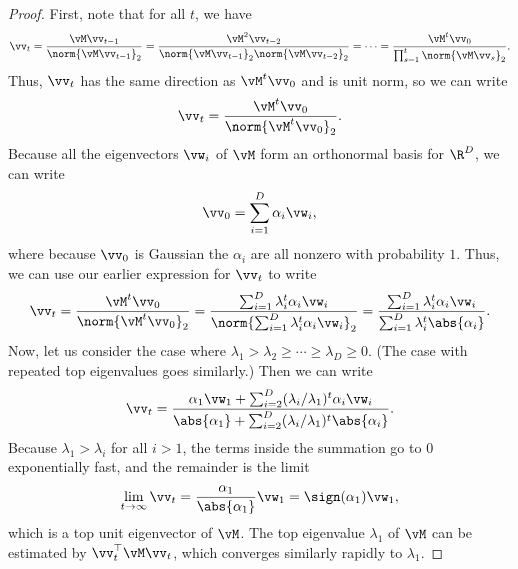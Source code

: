 \documentclass[../../book-main.tex]{subfiles}
\begin{document}
\begin{proof} First, note that for all \(t\), we have 
\begin{equation}
    \vv_{t} = \frac{\vM\vv_{t - 1}}{\norm{\vM\vv_{t - 1}}_{2}} = \frac{\vM^{2}\vv_{t - 2}}{\norm{\vM\vv_{t - 1}}_{2}\norm{\vM\vv_{t - 2}}_{2}} = \cdots = \frac{\vM^{t}\vv_{0}}{\prod_{s = 1}^{t}\norm{\vM\vv_{s}}_{2}}.
\end{equation}
Thus, \(\vv_{t}\) has the same direction as \(\vM^{t}\vv_{0}\) and is unit norm, so we can write 
\begin{equation}
    \vv_{t} = \frac{\vM^{t}\vv_{0}}{\norm{\vM^{t}\vv_{0}}_{2}}.
\end{equation}
Because all the eigenvectors \(\vw_{i}\) of $\vM$ form an orthonormal basis for \(\R^{D}\), we can write 
\begin{equation}
    \vv_{0} = \sum_{i = 1}^{D}\alpha_{i}\vw_{i},
\end{equation}
where because \(\vv_{0}\) is Gaussian the \(\alpha_{i}\) are all nonzero with probability \(1\). Thus, we can use our earlier expression for \(\vv_{t}\) to write
\begin{equation}
    \vv_{t} = \frac{\vM^{t}\vv_{0}}{\norm{\vM^{t}\vv_{0}}_{2}} = \frac{\sum_{i = 1}^{D}\lambda_{i}^{t}\alpha_{i}\vw_{i}}{\norm{\sum_{i = 1}^{D}\lambda_{i}^{t}\alpha_{i}\vw_{i}}_{2}} = \frac{\sum_{i = 1}^{D}\lambda_{i}^{t}\alpha_{i}\vw_{i}}{\sum_{i = 1}^{D}\lambda_{i}^{t}\abs{\alpha_{i}}}. 
\end{equation}
Now, let us consider the case where \(\lambda_{1} > \lambda_{2} \geq \cdots \geq \lambda_{D} \geq 0\). (The case with repeated top eigenvalues goes similarly.) Then we can write
\begin{equation}
    \vv_{t} = \frac{\alpha_{1}\vw_{1} + \sum_{i = 2}^{D}(\lambda_{i}/\lambda_{1})^{t}\alpha_{i}\vw_{i}}{\abs{\alpha_{1}} + \sum_{i = 2}^{D}(\lambda_{i}/\lambda_{1})^{t}\abs{\alpha_{i}}}.
\end{equation}
Because \(\lambda_{1} > \lambda_{i}\) for all \(i > 1\), the terms inside the summation go to \(0\) exponentially fast, and the remainder is the limit 
\begin{equation}
    \lim_{t \to \infty}\vv_{t} = \frac{\alpha_{1}}{\abs{\alpha_{1}}}\vw_{1} = \sign(\alpha_{1})\vw_{1},
\end{equation}
which is a top unit eigenvector of \(\vM\). The top eigenvalue \(\lambda_{1}\) of \(\vM\) can be estimated by \(\vv_{t}^{\top}\vM\vv_{t}\), which converges similarly rapidly to \(\lambda_{1}\). 
\end{proof}
\end{document}
